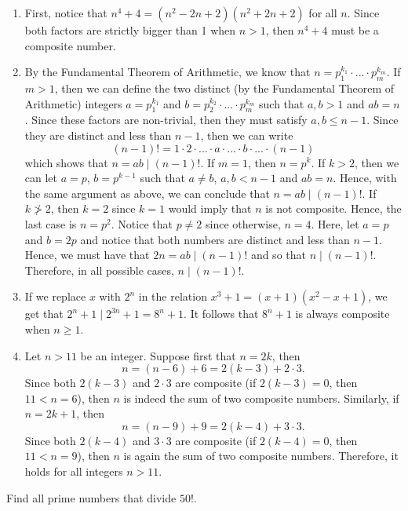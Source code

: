 \begin{solution}
    \begin{enumerate}
        \item First, notice that $n^4 + 4 = (n^2 - 2n + 2)(n^2 + 2n + 2)$ for all $n$. Since both factors are strictly bigger than 1 when $n > 1$, then $n^4 + 4$ must be a composite number.
        \item By the Fundamental Theorem of Arithmetic, we know that $n = p_1^{k_1}\cdot ... \cdot p_m^{k_m}$. If $m > 1$, then we can define the two distinct (by the Fundamental Theorem of Arithmetic) integers $a = p_1^{k_1}$ and $b = p_2^{k_2}\cdot ... \cdot p_m^{k_m}$ such that $a,b > 1$ and $ab = n$. Since these factors are non-trivial, then they must satisfy $a,b \leq n-1$. Since they are distinct and less than $n - 1$, then we can write
        $$(n-1)! = 1\cdot 2 \cdot ... \cdot a \cdot ... \cdot b \cdot ... \cdot (n-1)$$
        which shows that $n = ab \mid (n-1)!$. If $m = 1$, then $n = p^k$. If $k > 2$, then we can let $a = p$, $b = p^{k-1}$ such that $a \neq b$, $a,b < n-1$ and $ab = n$. Hence, with the same argument as above, we can conclude that $n = ab \mid (n-1)!$. If $k \not > 2$, then $k = 2$ since $k = 1$ would imply that $n$ is not composite. Hence, the last case is $n = p^2$. Notice that $p \neq 2$ since otherwise, $n = 4$. Here, let $a = p$ and $b = 2p$ and notice that both numbers are distinct and less than $n-1$. Hence, we must have that $2n = ab \mid (n-1)!$ and so that $n \mid (n-1)!$. Therefore, in all possible cases, $n \mid (n-1)!$.
        \item If we replace $x$ with $2^n$ in the relation $x^3 + 1 = (x+1)(x^2 - x + 1)$, we get that $2^n + 1 \mid 2^{3n} + 1 = 8^n + 1$. It follows that $8^n + 1$ is always composite when $n \geq 1$.
        \item Let $n > 11$ be an integer. Suppose first that $n = 2k$, then
        $$n = (n-6) + 6 = 2(k-3) + 2\cdot 3.$$
        Since both $2(k-3)$ and $2\cdot 3$ are composite (if $2(k-3) = 0$, then $11 < n = 6$), then $n$ is indeed the sum of two composite numbers. Similarly, if $n = 2k+1$, then 
        $$n = (n - 9) + 9 = 2(k-4) + 3\cdot3.$$
        Since both $2(k-4)$ and $3\cdot 3$ are composite (if $2(k-4) = 0$, then $11 < n = 9$), then $n$ is again the sum of two composite numbers. Therefore, it holds for all integers $n > 11$.
    \end{enumerate}
\end{solution}

\begin{exercise}
    Find all prime numbers that divide $50!$. \\
\end{exercise}

